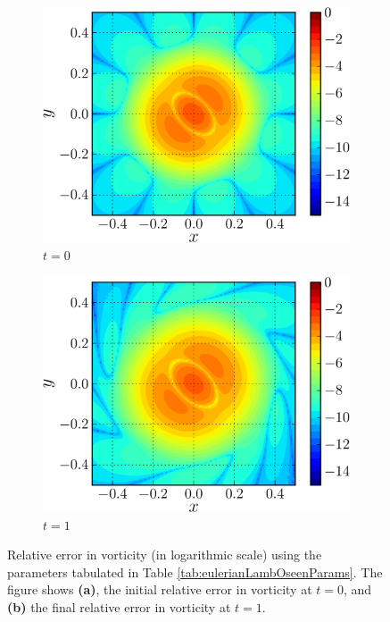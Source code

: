 	\begin{figure}[p]
     \centering
     \begin{subfigure}[b]{0.45\textwidth}
             \includegraphics[width=\textwidth]{figures/eulerian/lambOseen_wErrorInitial_compressed-crop.png}
             \caption{$t=0$}
             \label{fig:lambOseen_wErrorInitial_compressed-crop}
     \end{subfigure}%
     \qquad %
     \begin{subfigure}[b]{0.45\textwidth}
             \includegraphics[width=\textwidth]{figures/eulerian/lambOseen_wErrorFinal_compressed-crop.png}
             \caption{$t=1$}
             \label{fig:lambOseen_wErrorFinal_compressed-crop}
     \end{subfigure}
     
     \caption{Relative error in vorticity (in logarithmic scale) using the parameters tabulated in Table \ref{tab:eulerianLambOseenParams}. The figure shows \textbf{(a)}, the initial relative error in vorticity at $t=0$, and \textbf{(b)} the final relative error in vorticity at $t=1$.}
     \label{fig:lambOseen_eulerian_wRelField_compressed}
	\end{figure}	
	

